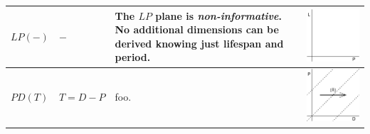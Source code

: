 \documentclass[
  12pt
]{scrartcl}
\begin{document}
\begin{center}
\begin{longtable}{m{}m{}m{}m{}}
  \midrule
  $LP(-)$ & $-$ &
  The $LP$ plane is \emph{non-informative}. No additional dimensions can be derived knowing just lifespan and period. &
  \includegraphics[width = \linewidth]{../fig/LP.pdf} \\
  \midrule
  $PD(T)$ & $T = D - P$ &
  foo. &
  \includegraphics[width = \linewidth]{../fig/PDt.pdf} \\

\end{longtable}
\end{center}
\end{document}
